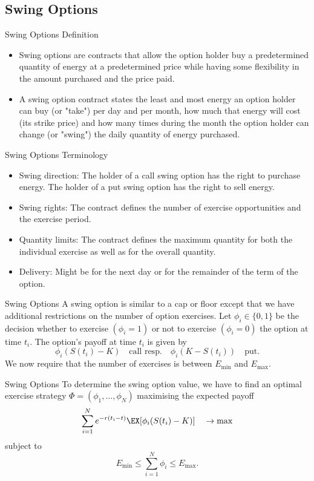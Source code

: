\subsection{Swing Options}


{Swing Options Definition}
\begin{itemize}
\item<1-> Swing options are contracts that allow the option holder buy a predetermined quantity of energy at a predetermined price while having some flexibility in the amount purchased and the price paid.

\item<2-> A swing option contract states the least and most energy an option holder can buy (or "take") per day and per month, how much that energy will cost (its strike price) and how many times during the month the option holder can change (or "swing") the daily quantity of energy purchased.
\end{itemize}



{Swing Options Terminology}
\begin{itemize}
  \item Swing direction: The holder of a call swing option has the right to purchase energy. The holder of a put swing option has the right to sell energy.
  \item Swing rights: The contract defines the number of exercise opportunities and the exercise period.
  \item Quantity limits: The contract defines the maximum quantity for both the individual exercise as well as for the overall quantity.
  \item Delivery: Might be for the next day or for the remainder of the term of the option.
\end{itemize}



{Swing Options}
A swing option is similar to a cap or floor except that we have
additional restrictions on the number of option exercises. Let
$\phi_i\in\{0,1\}$ be the decision whether to exercise
$(\phi_i=1)$ or not to exercise $(\phi_i=0)$ the option at time
$t_i$. The option's payoff at time $t_i$ is given by
$$\phi_i(S(t_i)-K)\quad\mbox{call resp.}\quad\phi_i(K-S(t_i))\quad\mbox{put}.$$
We now require that the number of exercises is between $E_{\min}$
and $E_{\max}$.


{Swing Options}
To determine the swing option value, we have to find an optimal exercise
strategy $\Phi=(\phi_1,\ldots,\phi_N)$ maximising the expected
payoff
$$\sum_{i=1}^Ne^{-r(t_i-t)}\EX[{\phi_i(S(t_i)-K)}]\quad\rightarrow\max$$
subject to $$E_{\min}\leq\sum_{i=1}^N\phi_i\leq E_{\max}.$$


